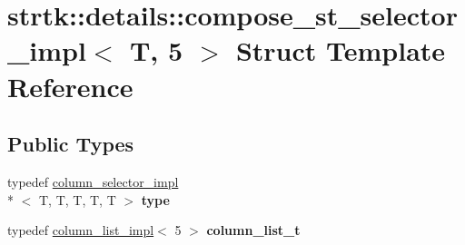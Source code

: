 \hypertarget{structstrtk_1_1details_1_1compose__st__selector__impl_3_01T_00_015_01_4}{\section{strtk\-:\-:details\-:\-:compose\-\_\-st\-\_\-selector\-\_\-impl$<$ T, 5 $>$ Struct Template Reference}
\label{structstrtk_1_1details_1_1compose__st__selector__impl_3_01T_00_015_01_4}
}
\subsection*{Public Types}
\begin{DoxyCompactItemize}
\item 
\hypertarget{structstrtk_1_1details_1_1compose__st__selector__impl_3_01T_00_015_01_4_abb03216f29483dda4896d3f8b188fa76}{typedef \hyperlink{classstrtk_1_1details_1_1column__selector__impl}{column\-\_\-selector\-\_\-impl}\\*
$<$ T, T, T, T, T $>$ {\bfseries type}}\label{structstrtk_1_1details_1_1compose__st__selector__impl_3_01T_00_015_01_4_abb03216f29483dda4896d3f8b188fa76}

\item 
\hypertarget{structstrtk_1_1details_1_1compose__st__selector__impl_3_01T_00_015_01_4_a1fd6056a9a440239282c5483263afc9b}{typedef \hyperlink{structstrtk_1_1details_1_1column__list__impl}{column\-\_\-list\-\_\-impl}$<$ 5 $>$ {\bfseries column\-\_\-list\-\_\-t}}\label{structstrtk_1_1details_1_1compose__st__selector__impl_3_01T_00_015_01_4_a1fd6056a9a440239282c5483263afc9b}

\end{DoxyCompactItemize}
